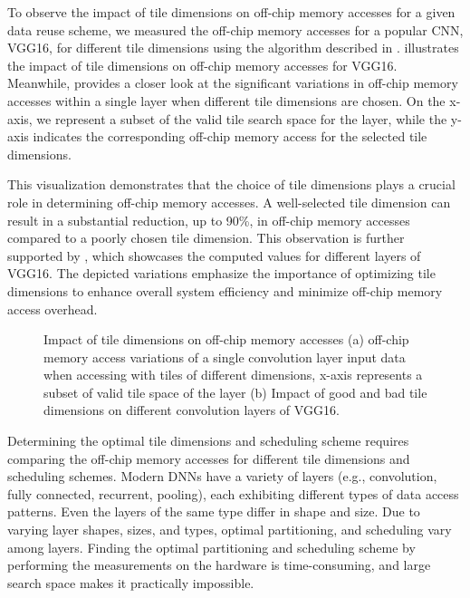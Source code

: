 To observe the impact of tile dimensions on off-chip memory accesses for a given data reuse scheme, we measured the off-chip memory accesses for a popular CNN, VGG16, for different tile dimensions using the algorithm described in .  illustrates the impact of tile dimensions on off-chip memory accesses for VGG16. Meanwhile,  provides a closer look at the significant variations in off-chip memory accesses within a single layer when different tile dimensions are chosen. On the x-axis, we represent a subset of the valid tile search space for the layer, while the y-axis indicates the corresponding off-chip memory access for the selected tile dimensions.

This visualization demonstrates that the choice of tile dimensions plays a crucial role in determining off-chip memory accesses. A well-selected tile dimension can result in a substantial reduction, up to 90\%, in off-chip memory accesses compared to a poorly chosen tile dimension. This observation is further supported by , which showcases the computed values for different layers of VGG16. The depicted variations emphasize the importance of optimizing tile dimensions to enhance overall system efficiency and minimize off-chip memory access overhead.

\begin{figure}[!h]
	\centering
	\captionsetup{font=sf}
	\hfil	
	\hfil	
	\caption{Impact of tile dimensions on off-chip memory accesses (a) off-chip memory access variations of a single convolution layer input data when accessing with tiles of different dimensions, x-axis represents a subset of valid tile space of the layer (b) Impact of good and bad tile dimensions on different convolution layers of VGG16.}
	\label{fig:impactOfTileDims}
\end{figure}

Determining the optimal tile dimensions and scheduling scheme requires comparing the off-chip memory accesses for different tile dimensions and scheduling schemes. Modern DNNs have a variety of layers (e.g., convolution, fully connected, recurrent, pooling), each exhibiting different types of data access patterns. Even the layers of the same type differ in shape and size. Due to varying layer shapes, sizes, and types, optimal partitioning, and scheduling vary among layers. Finding the optimal partitioning and scheduling scheme by performing the measurements on the hardware is time-consuming, and large search space makes it practically impossible.

